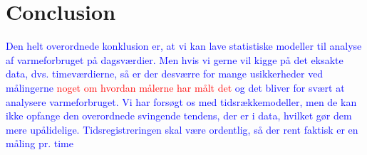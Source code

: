 \chapter{Conclusion}
\textcolor{blue}{Den helt overordnede konklusion er, at vi kan lave statistiske modeller til analyse af varmeforbruget på dagsværdier. Men hvis vi gerne vil kigge på det eksakte data, dvs. timeværdierne, så er der desværre for mange usikkerheder ved målingerne \textcolor{red}{noget om hvordan målerne har målt det} og det bliver for svært at analysere varmeforbruget. Vi har forsøgt os med tidsrækkemodeller, men de kan ikke opfange den overordnede svingende tendens, der er i data, hvilket gør dem mere upålidelige. Tidsregistreringen skal være ordentlig, så der rent faktisk er en måling pr. time}

